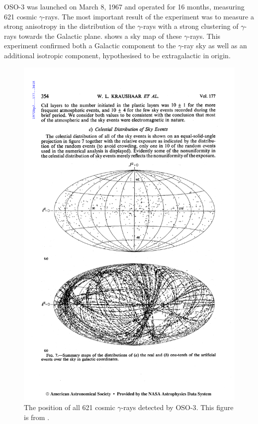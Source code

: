 \Ac{OSO-3} was launched on March 8, 1967 and operated for 16 months, measuring
621 cosmic $\gamma$-rays.  The most important result of the experiment was
to measure a strong anisotropy in the distribution of the $\gamma$-rays
with a strong clustering of $\gamma$-rays towards the Galactic plane.
 shows a sky map of these $\gamma$-rays.  This
experiment confirmed both a Galactic component to the $\gamma$-ray
sky as well as an additional isotropic component, hypothesised to be
extragalactic in origin.

\begin{figure}[htbp]
  \centering
  \includegraphics{chapters/introduction/figures/kraushaar_et_al_1972_skymap.pdf}
  \caption{The position of all 621 cosmic $\gamma$-rays
  detected by \ac{OSO-3}. This figure is from 
  \cite{kraushaar_1972_high-energy-cosmic}. }
\end{figure}



